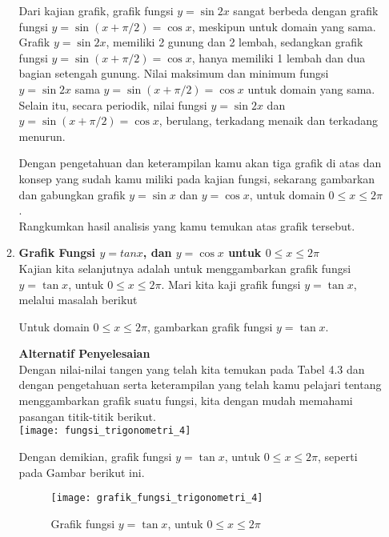 \documentclass[11pt,fleqn]{book} %
\begin{document}
\begin{myEnumerate}
\begin{itemize}
\begin{enumerate}
\begin{example}
Dari kajian grafik, grafik fungsi $y = \sin 2x$ sangat berbeda dengan grafik fungsi $y = \sin (x+\pi/2)  = \cos x$, meskipun untuk domain yang sama. Grafik $y = \sin 2x$, memiliki 2 gunung dan 2 lembah, sedangkan grafik fungsi $y = \sin (x+\pi/2)= \cos x$, hanya memiliki 1 lembah dan dua bagian setengah gunung. Nilai maksimum dan minimum fungsi $y = \sin 2x$ sama $y = \sin (x+\pi/2) = \cos x$ untuk domain yang sama. Selain itu, secara periodik, nilai fungsi $y = \sin 2x$ dan $y = \sin (x+\pi/2) = \cos x$, berulang, terkadang menaik dan terkadang menurun.
\end{example}
\begin{exercise}
Dengan pengetahuan dan keterampilan kamu akan tiga grafik di atas dan konsep yang sudah kamu miliki pada kajian fungsi, sekarang gambarkan dan gabungkan grafik $y = \sin x$ dan $y = \cos x$, untuk domain $0 \leq x\leq 2\pi$.\\
Rangkumkan hasil analisis yang kamu temukan atas grafik tersebut.
\end{exercise}
\item \textbf{Grafik Fungsi $y = tan x$, dan $y = \cos x$ untuk $0 \leq x\leq 2\pi$}\\
Kajian kita selanjutnya adalah untuk  menggambarkan grafik fungsi $y = \tan x$, untuk $0 \leq x\leq 2\pi$. Mari kita kaji grafik fungsi $y = \tan x$, melalui masalah berikut\\
\begin{problem}
Untuk domain $0 \leq x\leq 2\pi$, gambarkan grafik fungsi $y = \tan x$.\\
\end{problem}
\textbf{Alternatif Penyelesaian}\\
Dengan nilai-nilai tangen yang telah kita temukan pada Tabel 4.3 dan dengan pengetahuan serta keterampilan yang telah kamu pelajari tentang menggambarkan grafik suatu fungsi, kita dengan mudah memahami pasangan titik-titik berikut.\\

\texttt{[image: fungsi\_trigonometri\_4]}

Dengan demikian, grafik fungsi $y = \tan x$, untuk $0 \leq x\leq 2\pi$, seperti pada Gambar berikut ini.\\

\begin{figure}[!ht]
\begin{center}
\texttt{[image: grafik\_fungsi\_trigonometri\_4]} 
\caption{Grafik fungsi $y = \tan x$, untuk $0 \leq x\leq 2\pi$}
\end{center}
\end{figure}


\end{enumerate}
\end{itemize}
\end{myEnumerate}
\end{document}
